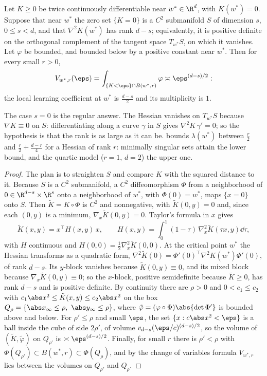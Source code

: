 \begin{refsection}
\begin{proposition}\label{prop:blowups:morsebott}
Let $K\ge0$ be twice continuously differentiable near $w^*\in\R^d$, with $K(w^*)=0$. Suppose that near $w^*$ the zero set $\{K=0\}$ is a $C^2$ submanifold $S$ of dimension $s$, $0\le s<d$, and that $\nabla^2K(w^*)$ has rank $d-s$; equivalently, it is positive definite on the orthogonal complement of the tangent space $T_{w^*}S$, on which it vanishes. Let $\varphi$ be bounded, and bounded below by a positive constant near $w^*$. Then for every small $r>0$,
\[
V_{w^*,r}(\eps)=\int_{\{K<\eps\}\cap B(w^*,r)}\varphi\asymp\eps^{(d-s)/2}:
\]
the local learning coefficient at $w^*$ is $\frac{d-s}2$ and its multiplicity is $1$.
\end{proposition}

The case $s=0$ is the regular answer. The Hessian vanishes on $T_{w^*}S$ because $\nabla K\equiv0$ on $S$: differentiating along a curve $\gamma$ in $S$ gives $\nabla^2K\,\gamma'=0$; so the hypothesis is that the rank is as large as it can be.  bounds $\lambda(w^*)$ between $\frac r2$ and $\frac r2+\frac{d-r}4$ for a Hessian of rank $r$: minimally singular sets attain the lower bound, and the quartic model ($r=1$, $d=2$) the upper one.

\begin{proof}
The plan is to straighten $S$ and compare $K$ with the squared distance to it. Because $S$ is a $C^2$ submanifold, a $C^2$ diffeomorphism $\Phi$ from a neighborhood of $0\in\R^{d-s}\times\R^s$ onto a neighborhood of $w^*$, with $\Phi(0)=w^*$, maps $\{x=0\}$ onto $S$. Then $\tilde K=K\circ\Phi$ is $C^2$ and nonnegative, with $\tilde K(0,y)=0$ and, since each $(0,y)$ is a minimum, $\nabla_x\tilde K(0,y)=0$. Taylor's formula in $x$ gives
\[
\tilde K(x,y)=x^\top H(x,y)\,x,\qquad H(x,y)=\int_0^1(1-\tau)\,\nabla_x^2\tilde K(\tau x,y)\dd\tau,
\]
with $H$ continuous and $H(0,0)=\frac12\nabla_x^2\tilde K(0,0)$. At the critical point $w^*$ the Hessian transforms as a quadratic form, $\nabla^2\tilde K(0)=\Phi'(0)^\top\nabla^2K(w^*)\Phi'(0)$, of rank $d-s$. Its $y$-block vanishes because $\tilde K(0,y)\equiv0$, and its mixed block because $\nabla_x\tilde K(0,y)\equiv0$; so the $x$-block, positive semidefinite because $\tilde K\ge0$, has rank $d-s$ and is positive definite. By continuity there are $\rho>0$ and $0<c_1\le c_2$ with $c_1\abs x^2\le\tilde K(x,y)\le c_2\abs x^2$ on the box $Q_\rho=\{\abs x_\infty\le\rho,\ \abs y_\infty\le\rho\}$, where $\tilde\varphi=(\varphi\circ\Phi)\abs{\det\Phi'}$ is bounded above and below. For $\rho'\le\rho$ and small $\eps$, the set $\{x:c\abs x^2<\eps\}$ is a ball inside the cube of side $2\rho'$, of volume $v_{d-s}(\eps/c)^{(d-s)/2}$, so the volume of $(\tilde K,\tilde\varphi)$ on $Q_{\rho'}$ is $\asymp\eps^{(d-s)/2}$. Finally, for small $r$ there is $\rho'<\rho$ with $\Phi(Q_{\rho'})\subset B(w^*,r)\subset\Phi(Q_\rho)$, and by the change of variables formula $V_{w^*,r}$ lies between the volumes on $Q_{\rho'}$ and $Q_\rho$.
\end{proof}


\end{refsection}

